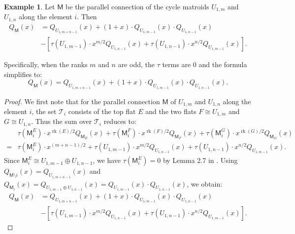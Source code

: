 \documentclass[11pt, a4paper, english]{amsart}
\theoremstyle{teoremas}
\theoremstyle{definition}
\newtheorem{example}[theorem]{Example}
\DeclareMathOperator{\rk}{rk}
\newcommand{\M}{\mathsf{M}}
\begin{document}
\begin{example}\label{ex:deletion_formula_ll_connection}
    Let $\M$ be the parallel connection of the cycle matroids $U_{1, m}$ and $U_{1, n}$ along the element $i$. Then
    \begin{align*}
        Q_{\M}(x) & = Q_{U_{1, m+n-1}}(x) + (1 + x)\cdot Q_{U_{1, m-1}}(x)\cdot Q_{U_{1, n-1}}(x)                                   \\
                  & -\left[ \tau(U_{1, m-1})\cdot x^{m/2}Q_{U_{1, n-1}}(x) + \tau(U_{1, n-1})\cdot x^{n/2}Q_{U_{1, m-1}}(x)\right].
    \end{align*}

    Specifically, when the ranks $m$ and $n$ are odd, the $\tau$ terms are 0 and the formula simplifies to:
    \[
        Q_{\M}(x) = Q_{U_{1, m+n-1}}(x) + (1 + x)\cdot Q_{U_{1, m-1}}(x)\cdot Q_{U_{1, n-1}}(x).
    \]
\end{example}
\begin{proof}
    We first note that for the parallel connection $\M$ of $U_{1, m}$ and $U_{1, n}$ along the element $i$, the set $\mathscr{T}_i$ consists of the top flat $E$ and the two flats $F\cong U_{1, m}$ and $G\cong U_{1, n}$.
    Thus the sum over $\mathscr{T}_i$ reduces to:
    \begin{align*}
          & \tau(\M^E_i)\cdot x^{\rk(E)/2}Q_{\M_E}(x) + \tau(\M^F_i)\cdot x^{\rk(F)/2}Q_{\M_F}(x) + \tau(\M^G_i)\cdot x^{\rk(G)/2}Q_{\M_G}(x)  \\
        = & \tau(\M^E_i)\cdot x^{(m+n-1)/2} + \tau(U_{1, m-1})\cdot x^{m/2}Q_{U_{1, n-1}}(x) + \tau(U_{1, n-1})\cdot x^{n/2}Q_{U_{1, m-1}}(x).
    \end{align*}
    Since $\M^E_i \cong U_{1, m-1} \oplus U_{1, n-1}$, we have $\tau(\M^E_i) = 0$ by Lemma 2.7 in \cite{braden-vysogorets}.
    Using $Q_{\M\setminus i}(x) = Q_{U_{1, m+n-1}}(x)$ and $Q_{\M_i}(x) = Q_{U_{1, m-1} \oplus U_{1, n-1}}(x)=Q_{U_{1, m-1}}(x)\cdot Q_{U_{1, n-1}}(x)$, we obtain:
    \begin{align*}
        Q_{\M}(x) & = Q_{U_{1, m+n-1}}(x) + (1 + x)\cdot Q_{U_{1, m-1}}(x)\cdot Q_{U_{1, n-1}}(x)                                   \\
                  & -\left[ \tau(U_{1, m-1})\cdot x^{m/2}Q_{U_{1, n-1}}(x) + \tau(U_{1, n-1})\cdot x^{n/2}Q_{U_{1, m-1}}(x)\right].
    \end{align*}
\end{proof}
\end{document}
